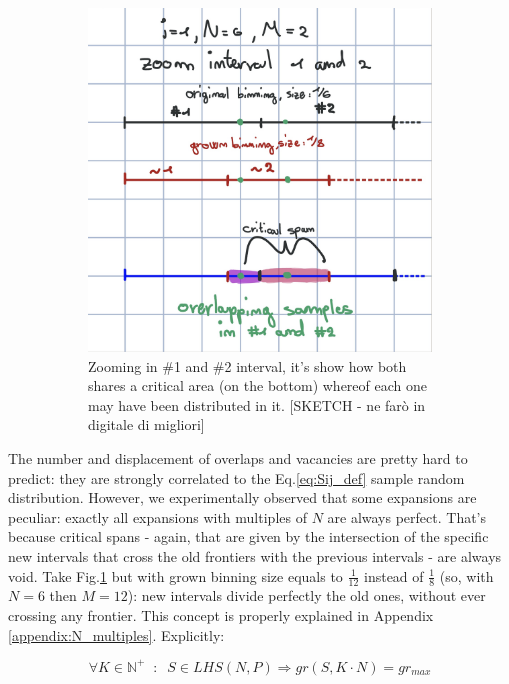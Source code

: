 \documentclass[12pt]{extarticle}
\newcommand{\meqref}[1]{Eq.\ref{#1}}
\newcommand{\mfigref}[1]{Fig.\ref{#1}}
\newcommand{\mappendixref}[1]{Appendix \ref{#1}}
\newcommand{\midcaption}[1]{
    \captionsetup{justification=centering}
    \caption{#1}
}
\begin{document}
\begin{figure}[h]
\begin{subfigure}[b]{0.45\textwidth}
{        	\includegraphics[width=\textwidth]{src/imgs/critical_span_zoom.jpg}
        	\caption{Zooming in \#1 and \#2 interval, it's show how both shares a critical area (on the bottom) whereof each one may have been distributed in it. [SKETCH - ne farò in digitale di migliori]}
        	\label{fig:critical_span2}
        }
    \end{subfigure}
    \midcaption{ }
    \label{fig:critical_span}
\end{figure}
 
The number and displacement of overlaps and vacancies are pretty hard to predict: they are strongly correlated to the \meqref{eq:Sij_def} sample random distribution. However, we experimentally observed that some expansions are peculiar: exactly all expansions with multiples of $N$ are always perfect. That's because critical spans - again, that are given by the intersection of the specific new intervals that cross the old frontiers with the previous intervals - are always void. Take \mfigref{fig:critical_span2} but with grown binning size equals to $\frac{1}{12}$ instead of $\frac{1}{8}$ (so, with $N = 6$ then $M = 12$): new intervals divide perfectly the old ones, without ever crossing any frontier. This concept is properly explained in \mappendixref{appendix:N_multiples}. Explicitly:

\begin{equation}
\label{eq:known_perfect_expansions}
\forall K \in \mathbb{N}^+ \;\; : \;\; S \in LHS(N, P) \Rightarrow gr(S, K \cdot N) = gr_{max}
\end{equation}
\end{document}
